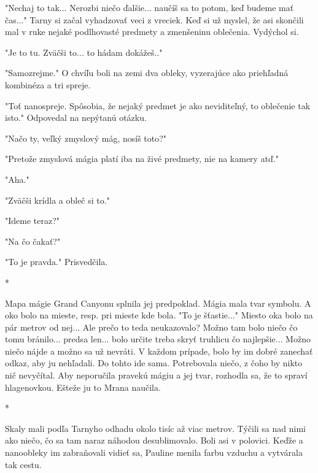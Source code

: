 \documentclass{book}
\begin{document}
"$ $Nechaj to tak... Nerozbi niečo ďalšie... naučíš sa to potom, keď budeme mať čas..."$ $  Tarny si začal vyhadzovať veci z vreciek. Keď si už myslel, že asi skončili mal v ruke nejaké podlhovasté predmety a zmenšeninu oblečenia. Vydýchol si.

"$ $Je to tu. Zväčši to... to hádam dokážeš.."$ $ 

"$ $Samozrejme."$ $  O chvíľu boli na zemi dva obleky, vyzerajúce ako priehľadná kombinéza a tri spreje.

"$ $Toť nanospreje. Spôsobia, že nejaký predmet je ako neviditeľný, to oblečenie tak isto."$ $  Odpovedal na nepýtanú otázku.

"$ $Načo ty, veľký zmyslový mág, nosíš toto?"$ $ 

"$ $Pretože zmyslová mágia platí iba na živé predmety, nie na kamery atď."$ $ 

"$ $Aha."$ $ 

"$ $Zväčši krídla a obleč si to."$ $ 

"$ $Ideme teraz?"$ $ 

"$ $Na čo čakať?"$ $ 

"$ $To je pravda."$ $  Prisvedčila.

\begin{center}

*

\end{center}

Mapa mágie Grand Canyonu splnila jej predpoklad. Mágia mala tvar symbolu. A oko bolo na mieste, resp. pri mieste kde bola. "$ $To je šťastie..."$ $  Miesto oka bolo na pár metrov od nej... Ale prečo to teda neukazovalo? Možno tam bolo niečo čo tomu bránilo... predsa len... bolo určite treba skryť truhlicu čo najlepšie... Možno niečo nájde a možno sa už nevráti. V každom prípade, bolo by im dobré zanechať odkaz, aby ju nehľadali. Do tohto ide sama. Potrebovala niečo, z čoho by nikto nič nevyčítal. Aby neporučila pravekú mágiu a jej tvar, rozhodla sa, že to spraví hlagenovkou. Ešteže ju to Mrana naučila.

\begin{center}

*

\end{center}

Skaly mali podľa Tarnyho odhadu okolo tisíc až viac metrov. Týčili sa nad nimi ako niečo, čo sa tam naraz náhodou desublimovalo. Boli asi v polovici. Keďže a nanoobleky im zabraňovali vidieť sa, Pauline menila farbu vzduchu a vytvárala tak cestu.
\end{document}
